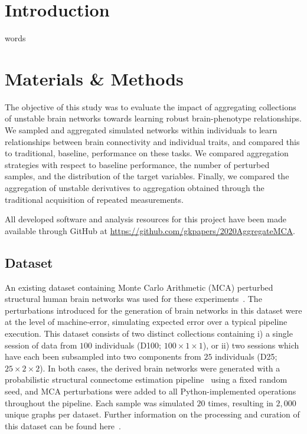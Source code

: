 \documentclass[10pt]{SelfArx} %
\affiliation{\textsuperscript{1}\textit{Montréal Neurological Institute, McGill University, Montréal, QC, Canada}}
\affiliation{\textsuperscript{2}\textit{Department of Computer Science and Software Engineering, Concordia University, Montréal, QC, Canada}}
\begin{document}
\flushbottom %
\maketitle %
\thispagestyle{empty} %

\pagestyle{fancy}
\section*{Introduction}
words

\section*{Materials \& Methods}

The objective of this study was to evaluate the impact of aggregating collections of unstable brain networks towards
learning robust brain-phenotype relationships. We sampled and aggregated simulated networks within individuals to learn
relationships between brain connectivity and individual traits, and compared this to traditional, baseline, performance
on these tasks. We compared aggregation strategies with respect to baseline performance, the number of perturbed
samples, and the distribution of the target variables. Finally, we compared the aggregation of unstable derivatives to
aggregation obtained through the traditional acquisition of repeated measurements.

All developed software and analysis resources for this project have been made available through GitHub at
\url{https://github.com/gkpapers/2020AggregateMCA}.

\subsection*{Dataset}

An existing dataset containing Monte Carlo Arithmetic (MCA) perturbed structural human brain networks was used for
these experiments~\cite{Kiar2020-yz}. The perturbations introduced for the generation of brain networks in this dataset
were at the level of machine-error, simulating expected error over a typical pipeline execution. This dataset consists
of two distinct collections containing i) a single session of data from $100$ individuals (D100;
$100\times 1 \times1$), or ii) two sessions which have each been subsampled into two components from $25$ individuals
(D25; $25\times 2\times 2$). In both cases, the derived brain networks were generated with a probabilistic structural
connectome estimation pipeline~\cite{Garyfallidis2014-ql} using a fixed random seed, and MCA perturbations were added
to all Python-implemented operations throughout the pipeline. Each sample was simulated $20$ times, resulting in
$2,000$ unique graphs per dataset. Further information on the processing and curation of this dataset can be found
here~\cite{Garyfallidis2014-ql}.
\end{document}

